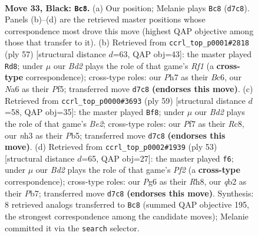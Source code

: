 \documentclass[11pt]{article}
\begin{document}
\clearpage

\begin{figure}[p]\centering
\begin{subfigure}{0.46\textwidth}\centering
\resizebox{\linewidth}{!}{%
\newchessgame
\chessboard[
  setfen={4r1k1/3b1p1p/n1q3p1/4Pp2/p4P2/7N/PQP2KPP/5BR1 b - - 3 33},
  showmover=false,
  pgfstyle=straightmove, color=movearrow, markmove={d7-c8}
]}
\caption{}
\end{subfigure}\hfill
\begin{subfigure}{0.46\textwidth}\centering
\resizebox{\linewidth}{!}{%
\newchessgame
\chessboard[
  setfen={5r2/2pk2p1/p1b1pq2/1pP2p2/5P1P/4Q1P1/PPB5/1K2R3 b - - 2 29},
  showmover=false,
  pgfstyle=straightmove, color=movearrow, markmove={f8-d8}
]}
\caption{}
\end{subfigure}
\\[4pt]
\begin{subfigure}{0.46\textwidth}\centering
\resizebox{\linewidth}{!}{%
\newchessgame
\chessboard[
  setfen={2r3k1/3qbpp1/p2p3p/1p1P4/n2B4/P4N1P/1P3PP1/1Q1R2K1 b - - 5 30},
  showmover=false,
  pgfstyle=straightmove, color=movearrow, markmove={e7-f8}
]}
\caption{}
\end{subfigure}\hfill
\begin{subfigure}{0.46\textwidth}\centering
\resizebox{\linewidth}{!}{%
\newchessgame
\chessboard[
  setfen={1k5r/1pq2p2/2p5/p1n2N2/Pb3P2/4PBP1/1PQ5/1K1R4 b - - 4 27},
  showmover=false,
  pgfstyle=straightmove, color=movearrow, markmove={f7-f6}
]}
\caption{}
\end{subfigure}
\caption{\textbf{Move 33, Black: \texttt{Bc8}.} (a) Our position; Melanie plays \texttt{Bc8} (\texttt{d7c8}). Panels (b)--(d) are the retrieved master positions whose correspondence most drove this move (highest QAP objective among those that transfer to it). (b) Retrieved from \texttt{ccrl\_top\_p0001\#2818} (ply 57) [structural distance $d$=63, QAP obj=43]: the master played \texttt{Rd8}; under $\mu$ our \emph{Bd2} plays the role of that game's \emph{Rf1} (a \textbf{cross-type} correspondence); cross-type roles: our \emph{P}h7 as their \emph{B}c6, our \emph{N}a6 as their \emph{P}f5; transferred move \texttt{d7c8} \textbf{(endorses this move)}. (c) Retrieved from \texttt{ccrl\_top\_p0000\#3693} (ply 59) [structural distance $d$=58, QAP obj=35]: the master played \texttt{Bf8}; under $\mu$ our \emph{Bd2} plays the role of that game's \emph{Be2}; cross-type roles: our \emph{P}f7 as their \emph{R}c8, our \emph{n}h3 as their \emph{P}b5; transferred move \texttt{d7c8} \textbf{(endorses this move)}. (d) Retrieved from \texttt{ccrl\_top\_p0002\#1939} (ply 53) [structural distance $d$=65, QAP obj=27]: the master played \texttt{f6}; under $\mu$ our \emph{Bd2} plays the role of that game's \emph{Pf2} (a \textbf{cross-type} correspondence); cross-type roles: our \emph{P}g6 as their \emph{R}h8, our \emph{q}b2 as their \emph{P}b7; transferred move \texttt{d7c8} \textbf{(endorses this move)}. Synthesis: 8 retrieved analogs transferred to \texttt{Bc8} (summed QAP objective 195, the strongest correspondence among the candidate moves); Melanie committed it via the \texttt{search} selector.}
\label{fig:thought-m65}
\end{figure}
\end{document}
